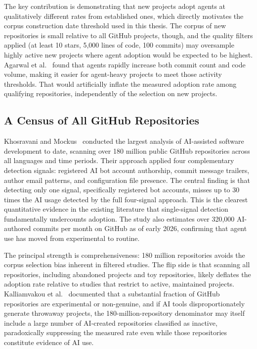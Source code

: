 The key contribution is demonstrating that new projects adopt agents at qualitatively
different rates from established ones, which directly motivates the corpus
construction date threshold used in this thesis. The corpus of new repositories is
small relative to all GitHub projects, though, and the quality filters applied
(at least 10 stars, 5,000 lines of code, 100 commits) may oversample highly active
new projects where agent adoption would be expected to be highest. Agarwal et
al.~\cite{agarwal2026} found that agents rapidly increase both commit count and code
volume, making it easier for agent-heavy projects to meet those activity thresholds.
That would artificially inflate the measured adoption rate among qualifying repositories,
independently of the selection on new projects.

\subsection{A Census of All GitHub Repositories}

Khosravani and Mockus~\cite{khosravani2026} conducted the largest analysis of
AI-assisted software development to date, scanning over 180 million public GitHub
repositories across all languages and time periods. Their approach applied four
complementary detection signals: registered AI bot account authorship, commit
message trailers, author email patterns, and configuration file presence. The
central finding is that detecting only one signal, specifically registered bot
accounts, misses up to 30 times the AI usage detected by the full four-signal
approach. This is the clearest quantitative evidence in the existing literature
that single-signal detection fundamentally undercounts adoption. The study also
estimates over 320,000 AI-authored commits per month on GitHub as of early 2026,
confirming that agent use has moved from experimental to routine.

The principal strength is comprehensiveness: 180 million repositories avoids the
corpus selection bias inherent in filtered studies. The flip side is that scanning
all repositories, including abandoned projects and toy repositories, likely deflates
the adoption rate relative to studies that restrict to active, maintained projects.
Kalliamvakou et al.~\cite{kalliamvakou2016} documented that a substantial fraction
of GitHub repositories are experimental or non-genuine, and if AI tools
disproportionately generate throwaway projects, the 180-million-repository denominator
may itself include a large number of AI-created repositories classified as inactive,
paradoxically suppressing the measured rate even while those repositories constitute
evidence of AI use.

